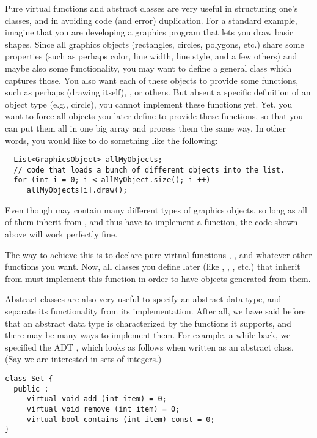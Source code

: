 Pure virtual functions and abstract classes are very useful in
structuring one's classes,
and in avoiding code (and error) duplication.
For a standard example, imagine that you are developing a graphics
program that lets you draw basic shapes.
Since all graphics objects (rectangles, circles, polygons, etc.)
share some properties (such as perhaps color, line width, line style,
and a few others)
and maybe also some functionality,
you may want to define a general class
 which captures those.
You also want each of these objects to provide some functions, such as
perhaps  (drawing itself), , or others.
But absent a specific definition of an object type (e.g., circle), you
cannot implement these functions yet.
Yet, you want to force all  objects you later
define to provide these functions,
so that you can put them all in one big array and process them the
same way.
In other words, you would like to do something like the following:
\begin{verbatim}
  List<GraphicsObject> allMyObjects;
  // code that loads a bunch of different objects into the list.
  for (int i = 0; i < allMyObject.size(); i ++)
     allMyObjects[i].draw();
\end{verbatim}
Even though  may contain many different types of
graphics objects, so long as all of them inherit from
, and thus have to implement a 
function, the code shown above will work perfectly fine.

The way to achieve this is to declare pure virtual functions
, , and whatever other functions you want.
Now, all classes you define later (like ,
, , etc.) that inherit from 
 must implement this function in order to have
objects generated from them.

Abstract classes are also very useful to specify an abstract data
type, and separate its functionality from its implementation.
After all, we have said before that an abstract data type is
characterized by the functions it supports, and there may be many ways
to implement them.
For example, a while back, we specified the ADT ,
which looks as follows when written as an abstract class.
(Say we are interested in sets of integers.)

\begin{verbatim}
class Set {
  public :
     virtual void add (int item) = 0;
     virtual void remove (int item) = 0;
     virtual bool contains (int item) const = 0;
}
\end{verbatim}

